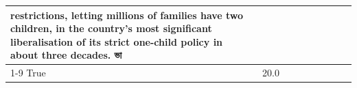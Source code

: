 \begin{table}[H]
\begin{tabular}{lllrlllll}
restrictions, letting millions of families have two children, in the country's most significant liberalisation of its strict one-child policy in about three decades. ভা \\
\cline{1-9}
True & 20.0%
\end{tabular}
\end{table}
